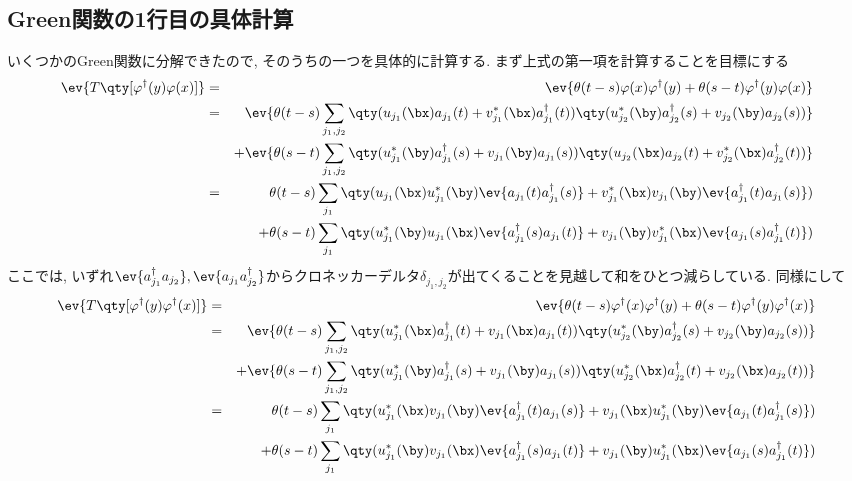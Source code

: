 \documentclass[10.5pt,a4paper]{jreport}
\begin{document}
\subsection{Green関数の1行目の具体計算}
いくつかのGreen関数に分解できたので, そのうちの一つを具体的に計算する. まず上式の第一項を計算することを目標にする
\begin{eqnarray}
  \ev{T\qty[\varphi^\dagger(y)\varphi(x)]} &=&\ev{\theta(t-s)\varphi(x)\varphi^\dagger(y)+\theta(s-t)\varphi^\dagger(y)\varphi(x)}\\
  \nonumber  &=&\ev{\theta(t-s)\sum_{j_1, j_2}\qty(u_{j_1}(\bx)a_{j_1}(t) + v_{j_1}^*(\bx)a_{j_1}^\dagger(t))\qty(u_{j_2}^*(\by)a_{j_2}^\dagger(s) + v_{j_2}(\by)a_{j_2}(s))}\\
\nonumber  &&+ \ev{\theta(s-t)\sum_{j_1, j_2}\qty(u_{j_1}^*(\by)a_{j_1}^\dagger(s) + v_{j_1}(\by)a_{j_1}(s))\qty(u_{j_2}(\bx)a_{j_2}(t) + v^*_{j_2}(\bx)a^\dagger_{j_2}(t))}\\
\nonumber&=&\theta(t-s)\sum_{j_1}\qty(u_{j_1}(\bx)u_{j_1}^*(\by)\ev{a_{j_1}(t)a_{j_1}^\dagger(s)} + v_{j_1}^*(\bx)v_{j_1}(\by)\ev{a_{j_1}^\dagger(t)a_{j_1}(s)})\\
&&+\theta(s-t)\sum_{j_1}\qty(u_{j_1}^*(\by)u_{j_1}(\bx)\ev{a_{j_1}^\dagger(s)a_{j_1}(t)} + v_{j_1}(\by)v_{j_1}^*(\bx)\ev{a_{j_1}(s)a_{j_1}^\dagger(t)})
\end{eqnarray}
ここでは, いずれ$\ev{a_{j_1}^\dagger a_{j_2}}, \ev{a_{j_1} a_{j_2}^\dagger}$からクロネッカーデルタ$\delta_{j_1, j_2}$が出てくることを見越して和をひとつ減らしている. 同様にして
\begin{eqnarray}
  \ev{T\qty[\varphi^\dagger(y)\varphi^\dagger(x)]} &=&\ev{\theta(t-s)\varphi^\dagger(x)\varphi^\dagger(y)+\theta(s-t)\varphi^\dagger(y)\varphi^\dagger(x)}\\
  \nonumber  &=&\ev{\theta(t-s)\sum_{j_1, j_2}\qty(u^*_{j_1}(\bx)a^\dagger_{j_1}(t) + v_{j_1}(\bx)a_{j_1}(t))\qty(u_{j_2}^*(\by)a_{j_2}^\dagger(s) + v_{j_2}(\by)a_{j_2}(s))}\\
\nonumber  &&+ \ev{\theta(s-t)\sum_{j_1, j_2}\qty(u_{j_1}^*(\by)a_{j_1}^\dagger(s) + v_{j_1}(\by)a_{j_1}(s))\qty(u^*_{j_2}(\bx)a^\dagger_{j_2}(t) + v_{j_2}(\bx)a_{j_2}(t))}\\
\nonumber&=& \theta(t-s)\sum_{j_1}\qty(u^*_{j_1}(\bx)v_{j_1}(\by)\ev{a_{j_1}^\dagger(t)a_{j_1}(s)} + v_{j_1}(\bx)u^*_{j_1}(\by)\ev{a_{j_1}(t)a_{j_1}^\dagger(s)})\\
&&+\theta(s-t)\sum_{j_1}\qty(u^*_{j_1}(\by)v_{j_1}(\bx)\ev{a_{j_1}^\dagger(s)a_{j_1}(t)} + v_{j_1}(\by)u^*_{j_1}(\bx)\ev{a_{j_1}(s)a_{j_1}^\dagger(t)})
\end{eqnarray}
\end{document}
